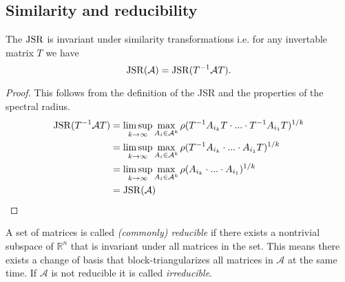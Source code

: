 \subsection*{Similarity and reducibility}

\begin{proposition}
    The $\operatorname{JSR}$ is invariant under similarity transformations i.e. for any invertable matrix $T$ we have
    \begin{equation}
       \operatorname{JSR}(\mathcal{A}) = \operatorname{JSR}(T^{-1}\mathcal{A}T).
    \end{equation}
\end{proposition}

\begin{proof}
    This follows from the definition of the JSR and the properties of the spectral radius.
    \begin{align*}
    \operatorname{JSR}(T^{-1}\mathcal{A}T) & = \limsup_{k \to \infty} \max_{A_i \in \mathcal{A}^k} \rho(T^{-1}A_{i_k}T \cdot ... \cdot T^{-1}A_{i_1}T)^{1/k}\\
    & = \limsup_{k \to \infty} \max_{A_i \in \mathcal{A}^k} \rho(T^{-1}A_{i_k} \cdot ... \cdot A_{i_1}T)^{1/k}\\
    & = \limsup_{k \to \infty} \max_{A_i \in \mathcal{A}^k} \rho(A_{i_k} \cdot ... \cdot A_{i_1})^{1/k}\\
    & = \operatorname{JSR}(\mathcal{A})   
    \end{align*}
\end{proof}

\begin{definition}
    A set of matrices is called \emph{(commonly) reducible} if there exists a nontrivial subspace of $\mathbb{R}^n$ that is invariant under all matrices in the set. This means there exists a change of basis that block-triangularizes all matrices in $\mathcal{A}$ at the same time. If $\mathcal{A}$ is not reducible it is called \emph{irreducible}. 
\end{definition}

